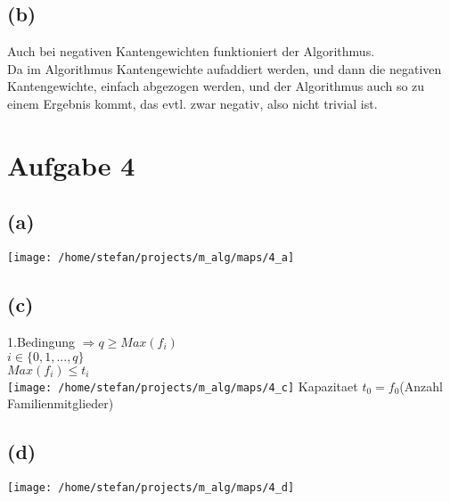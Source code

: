 \documentclass[a4paper]{scrartcl}
\begin{document}
\subsection*{(b)}
Auch bei negativen Kantengewichten funktioniert der Algorithmus.\\
Da im Algorithmus Kantengewichte aufaddiert werden, und dann die negativen Kantengewichte, einfach abgezogen werden, und der Algorithmus auch so zu einem Ergebnis kommt, das evtl. zwar negativ, also nicht trivial ist.
\section*{Aufgabe 4}
\subsection*{(a)}
\texttt{[image: /home/stefan/projects/m\_alg/maps/4\_a]}
 

\subsection*{(c)}
1.Bedingung $\Rightarrow q \geq Max(f_i)$\\
$i \in \lbrace 0,1,...,q \rbrace$\\
$Max(f_i) \leq t_i$\\

\texttt{[image: /home/stefan/projects/m\_alg/maps/4\_c]}
Kapazitaet $t_0 = f_0$(Anzahl Familienmitglieder)
	
\subsection*{(d)}
\texttt{[image: /home/stefan/projects/m\_alg/maps/4\_d]}
\end{document}
